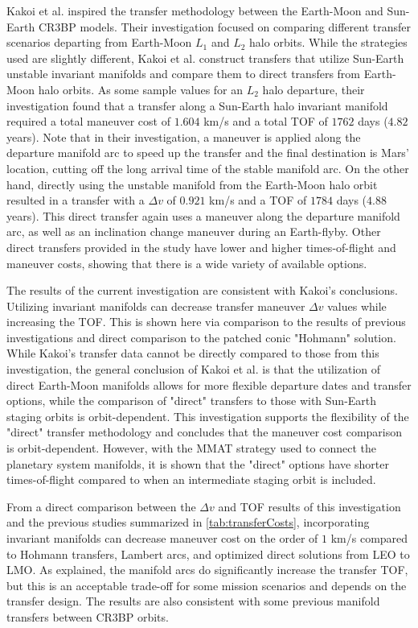 Kakoi et al. inspired the transfer methodology between the Earth-Moon and Sun-Earth CR3BP
models\cite{Kakoi:2014,Kakoi:2015}. Their investigation focused on comparing different transfer
scenarios departing from Earth-Moon $L_{1}$ and $L_{2}$ halo orbits. While the strategies used are
slightly different, Kakoi et al. construct transfers that utilize Sun-Earth unstable invariant
manifolds and compare them to direct transfers from Earth-Moon halo orbits. As some sample values
for an $L_{2}$ halo departure, their investigation found that a transfer along a Sun-Earth halo
invariant manifold required a total maneuver cost of $1.604$ km/s and a total TOF of $1762$ days
($4.82$ years). Note that in their investigation, a maneuver is applied along the departure
manifold arc to speed up the transfer and the final destination is Mars' location, cutting off the
long arrival time of the stable manifold arc. On the other hand, directly using the unstable
manifold from the Earth-Moon halo orbit resulted in a transfer with a $\Delta v$ of $0.921$ km/s
and a TOF of $1784$ days ($4.88$ years)\cite{Kakoi:2015}. This direct transfer again uses a
maneuver along the departure manifold arc, as well as an inclination change maneuver during an
Earth-flyby. Other direct transfers provided in the study have lower and higher times-of-flight and
maneuver costs, showing that there is a wide variety of available options.

The results of the current investigation are consistent with Kakoi's conclusions. Utilizing
invariant manifolds can decrease transfer maneuver $\Delta v$ values while increasing the
TOF\cite{Kakoi:2015}. This is shown here via comparison to the results of previous investigations
and direct comparison to the patched conic "Hohmann" solution. While Kakoi's transfer data cannot
be directly compared to those from this investigation, the general conclusion of Kakoi et al. is
that the utilization of direct Earth-Moon manifolds allows for more flexible departure dates and
transfer options, while the comparison of "direct" transfers to those with Sun-Earth staging orbits
is orbit-dependent\cite{Kakoi:2014,Kakoi:2015}. This investigation supports the flexibility of the
"direct" transfer methodology and concludes that the maneuver cost comparison is orbit-dependent.
However, with the MMAT strategy used to connect the planetary system manifolds, it is shown that
the "direct" options have shorter times-of-flight compared to when an intermediate staging orbit is
included.

From a direct comparison between the $\Delta v$ and TOF results of this investigation and the
previous studies summarized in \cref{tab:transferCosts}, incorporating invariant manifolds can
decrease maneuver cost on the order of $1$ km/s compared to Hohmann transfers, Lambert
arcs\cite{Eagle:2022}, and optimized direct solutions from LEO to LMO\cite{Miele:1999}. As
explained, the manifold arcs do significantly increase the transfer TOF, but this is an acceptable
trade-off for some mission scenarios and depends on the transfer design. The results are also
consistent with some previous manifold transfers between CR3BP
orbits\cite{Cavallari:2019,Canales:2022}.

